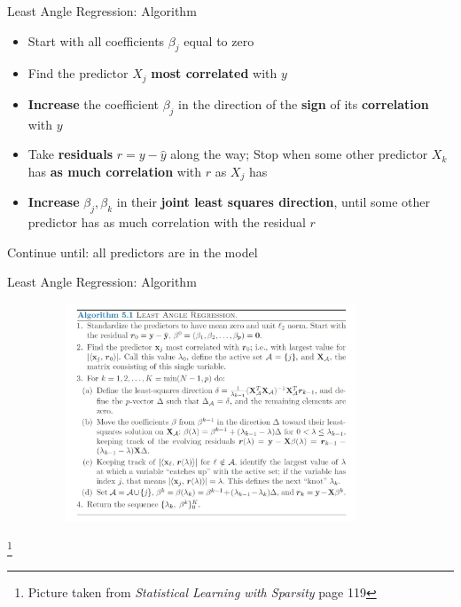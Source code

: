 \documentclass{beamer}
\begin{document}
\begin{frame}{Least Angle Regression: Algorithm}
    \begin{itemize}
        \item Start with all coefficients \(\beta_j\) equal to zero
        \item Find the predictor $X_j$ \textbf{most correlated} with $y$
        \item  \textbf{Increase} the coefficient \(\beta_j\) in the direction of the \textbf{sign} of its \textbf{correlation} with $y$
        \item Take \textbf{residuals} \(r=y-\hat{y}\) along the way; Stop when some other predictor \(X_k\) has \textbf{ as much correlation} with $r$ as \(X_j\) has
        \item \textbf{Increase} \(\beta_j,\beta_k\) in their \textbf{joint least squares direction}, until some other predictor has as much correlation with the residual $r$
    \end{itemize}
Continue until: all predictors are in the model
\end{frame}

\begin{frame}{Least Angle Regression: Algorithm}
\begin{figure}[h]
\centering
\includegraphics[width=10cm,height=6.5cm]{img/LARS}
\end{figure}
\footnote{Picture taken from \textit{Statistical Learning with Sparsity}  page 119 }
\end{frame}
\end{document}
